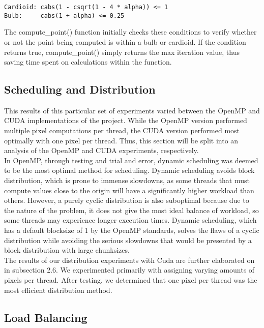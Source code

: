 \documentclass{article}
\begin{document}
\begin{verbatim}
Cardioid: cabs(1 - csqrt(1 - 4 * alpha)) <= 1
Bulb:     cabs(1 + alpha) <= 0.25
\end{verbatim}

The compute\_point() function initially checks these conditions to verify whether or not the point being computed is within a bulb or cardioid.
If the condition returns true, compute\_point() simply returns the max iteration value, thus saving time spent on calculations within the function.

\subsection{Scheduling and Distribution}

This results of this particular set of experiments varied between the OpenMP and CUDA implementations of the project.
While the OpenMP version performed multiple pixel computations per thread, the CUDA version performed most optimally with one pixel per thread.
Thus, this section will be split into an analysis of the OpenMP and CUDA experiments, respectively.\\

In OpenMP, through testing and trial and error, dynamic scheduling was deemed to be the most optimal method for scheduling. Dynamic scheduling avoids block distribution, which is prone to immense slowdowns, as some threads that must compute values close to the origin will have a significantly higher workload than others. However, a purely cyclic distribution is also suboptimal because due to the nature of the problem, it does not give the most ideal balance of workload, so some threads may experience longer execution times. Dynamic scheduling, which has a default blocksize of 1 by the OpenMP standards, solves the flaws of a cyclic distribution while avoiding the serious slowdowns that would be presented by a block distribution with large chunksizes.\\

The results of our distribution experiments with Cuda are further elaborated on in subsection 2.6. We experimented primarily with assigning varying amounts of pixels per thread. After testing, we determined that one pixel per thread was the most efficient distribution method. 

\subsection{Load Balancing}
\end{document}
